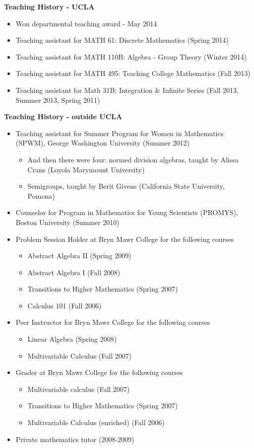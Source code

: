 \documentclass[11pt]{article}
\theoremstyle{plain} \numberwithin{equation}{section}
\theoremstyle{definition}
\begin{document}

{\large\textbf{Teaching History - UCLA}} \medskip

\begin{itemize} 
\item Won departmental teaching award - May 2014
\item Teaching assistant for MATH 61: Discrete Mathematics (Spring 2014)
\item Teaching assistant for MATH 110B: Algebra - Group Theory (Winter 2014) 
\item Teaching assistant for MATH 495: Teaching College Mathematics (Fall 2013)
\item Teaching assistant for Math 31B: Integration \& Infinite Series (Fall 2013, Summer 2013, Spring 2011)
\end{itemize} \medskip

{\large\textbf{Teaching History - outside UCLA}} \medskip

\begin{itemize} 
\item Teaching assistant for Summer Program for Women in Mathematics (SPWM), George Washington University (Summer 2012)
	\begin{itemize}
	\item And then there were four: normed division algebras, taught by Alissa Crans (Loyola Marymount University)
	\item Semigroups, taught by Berit Givens (California State University, Pomona)
	\end{itemize} 
\item Counselor for Program in Mathematics for Young Scientists (PROMYS), Boston University (Summer 2010)
\item Problem Session Holder at Bryn Mawr College for the following courses
	\begin{itemize}
	\item Abstract Algebra II (Spring 2009)
	\item Abstract Algebra I (Fall 2008)
	\item Transitions to Higher Mathematics (Spring 2007)
	\item Calculus 101 (Fall 2006)
	\end{itemize}
\item Peer Instructor for Bryn Mawr College for the following courses
	\begin{itemize}
	\item Linear Algebra (Spring 2008)
	\item Multivariable Calculus (Fall 2007)
	\end{itemize}
\item Grader at Bryn Mawr College for the following courses
	\begin{itemize}
	\item Multivariable calculus (Fall 2007)
	\item Transitions to Higher Mathematics (Spring 2007)
	\item Multivariable Calculus (enriched) (Fall 2006)
	\end{itemize}
\item Private mathematics tutor (2008-2009)
\end{itemize}
\end{document}
